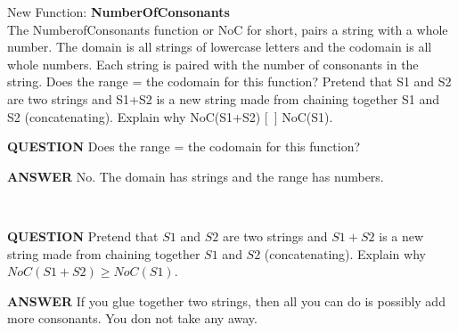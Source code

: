 \documentclass{ximera}
\begin{document}
\begin{exploration}
New Function: \textbf{NumberOfConsonants}\\
The NumberofConsonants function or NoC for short, pairs a string with a whole number. The domain is all strings of lowercase letters and the codomain is all whole numbers. Each string is paired with the number of consonants in the string.
Does the range = the codomain for this function?
Pretend that S1 and S2 are two strings and S1+S2 is a new string made from chaining together S1 and S2 (concatenating).  Explain why NoC(S1+S2) [~] NoC(S1).
\quad \\

\begin{dialogue}
\item[\textbf{QUESTION}] Does the range = the codomain for this function?
\item[\textbf{ANSWER}] No. The domain has strings and the range has numbers.
\end{dialogue}

\quad \\


\begin{dialogue}
\item[\textbf{QUESTION}] Pretend that $S1$ and $S2$ are two strings and $S1+S2$ is a new string made from chaining together $S1$ and $S2$ (concatenating).  Explain why $NoC(S1+S2) \geq NoC(S1)$.
\item[\textbf{ANSWER}] If you glue together two strings, then all you can do is possibly add more consonants. You don not take any away.
\end{dialogue}

\end{exploration}
\quad \\
\end{document}
